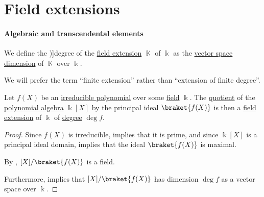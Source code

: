 \section{Field extensions}\label{sec:field_extensions}

\paragraph{Algebraic and transcendental elements}

\begin{definition}\label{def:field_extension_degree}
  We define the \term[ru=степень (def. \cite[9.5.1]{Винберг2014КурсАлгебры})]{degree} of the \hyperref[def:field/submodel]{field extension} \( \BbbK \) of \( \Bbbk \) as the \hyperref[thm:vector_space_dimension]{vector space dimension} of \( \BbbK \) over \( \Bbbk \).

  We will prefer the term \enquote{finite extension} rather than \enquote{extension of finite degree}.
\end{definition}

\begin{lemma}\label{thm:quotient_by_irreducible_polynomial}
  Let \( f(X) \) be an \hyperref[def:domain_divisibility/irreducible]{irreducible polynomial} over some \hyperref[def:field]{field} \( \Bbbk \). The \hyperref[def:algebra_over_ring/quotient]{quotient} of the \hyperref[def:polynomial_algebra]{polynomial algebra} \( \Bbbk[X] \) by the principal ideal \( \braket{ f(X) } \) is then a \hyperref[def:field/submodel]{field extension} of \( \Bbbk \) of \hyperref[def:field_extension_degree]{degree} \( \deg f \).
\end{lemma}
\begin{proof}
  Since \( f(X) \) is irreducible,  implies that it is prime, and since \( \Bbbk[X] \) is a principal ideal domain,  implies that the ideal \( \braket{ f(X) } \) is maximal.

  By , \( \Bbbk[X] / \braket{ f(X) } \) is a field.

  Furthermore,  implies that \( \Bbbk[X] / \braket{ f(X) } \) has dimension \( \deg f \) as a vector space over \( \Bbbk \).
\end{proof}

